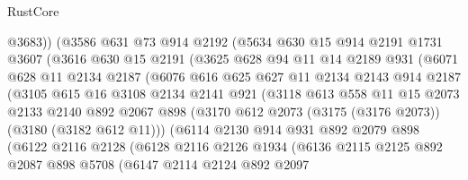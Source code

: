 \begin{lexlean}{RustCore}
\begin{coremodule}
                @3683))
            (@3586
              @631
              @73
              @914
              @2192
              (@5634
                @630
                @15
                @914
                @2191
                @1731
                @3607
                (@3616
                  @630
                  @15
                  @2191
                  (@3625
                    @628
                    @94
                    @11
                    @14
                    @2189
                    @931
                    (@6071
                      @628
                      @11
                      @2134
                      @2187
                      (@6076
                        @616
                        @625
                        @627
                        @11
                        @2134
                        @2143
                        @914
                        @2187
                        (@3105
                          @615
                          @16
                          @3108
                          @2134
                          @2141
                          @921
                          (@3118
                            @613
                            @558
                            @11
                            @15
                            @2073
                            @2133
                            @2140
                            @892
                            @2067
                            @898
                            (@3170 @612 @2073 (@3175 (@3176 @2073)) (@3180 (@3182 @612 @11)))
                            (@6114
                              @2130
                              @914
                              @931
                              @892
                              @2079
                              @898
                              (@6122
                                @2116
                                @2128
                                (@6128
                                  @2116
                                  @2126
                                  @1934
                                  (@6136
                                    @2115
                                    @2125
                                    @892
                                    @2087
                                    @898
                                    @5708
                                    (@6147
                                      @2114
                                      @2124
                                      @892
                                      @2097

\end{coremodule}
\end{lexlean}
